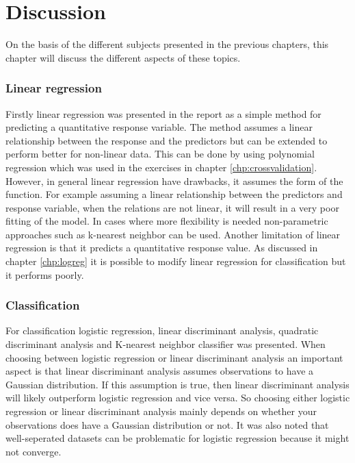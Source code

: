 \chapter{Discussion}
\label{chp:disc}
On the basis of the different subjects presented in the previous chapters, this chapter will discuss the different aspects of these  topics.

\subsection{Linear regression}

Firstly linear regression was presented in the report as a simple method for predicting a quantitative response variable. The method assumes a linear relationship between the response and the predictors but can be extended to perform better for non-linear data. This can be done by using polynomial regression which was used in the exercises in chapter \ref{chp:crossvalidation}. However, in general linear regression have drawbacks, it assumes the form of the function. For example assuming a linear relationship between the predictors and response variable, when the relations are not linear, it will result in a very poor fitting of the model. In cases where more flexibility is needed non-parametric approaches such as k-nearest neighbor can be used. Another limitation of linear regression is that it predicts a quantitative response value. As discussed in chapter \ref{chp:logreg} it is possible to modify linear regression for classification but it performs poorly.

\subsection{Classification}

For classification logistic regression, linear discriminant analysis, quadratic discriminant analysis and K-nearest neighbor classifier was presented. When choosing between logistic regression or linear discriminant analysis an important aspect is that linear discriminant analysis assumes observations to have a Gaussian distribution. If this assumption is true, then linear discriminant analysis will likely outperform logistic regression and vice versa. So choosing either logistic regression or linear discriminant analysis mainly depends on whether your observations does have a Gaussian distribution or not. It was also noted that well-seperated datasets can be problematic for logistic regression because it might not converge.
 
